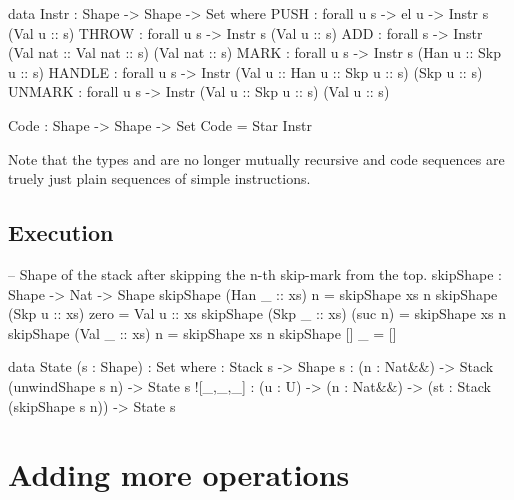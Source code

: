 \begin{code}
  data Instr : Shape -> Shape -> Set where
    PUSH : forall {u s} -> el u -> Instr s (Val u :: s)
    THROW : forall {u s} -> Instr s (Val u :: s)
    ADD : forall {s} -> Instr (Val nat :: Val nat :: s) (Val nat :: s)
    MARK : forall {u s} -> Instr s (Han u :: Skp u :: s)
    HANDLE : forall {u s} -> Instr (Val u :: Han u :: Skp u :: s) (Skp u :: s)
    UNMARK : forall {u s} -> Instr (Val u :: Skp u :: s) (Val u :: s)
\end{code}
\begin{code}
  Code : Shape -> Shape -> Set
  Code = Star Instr
\end{code}
\noindent Note that the types  and  are no longer mutually recursive
and code sequences are truely just plain sequences of simple instructions.

\subsection{Execution}

\begin{code}
  -- Shape of the stack after skipping the n-th skip-mark from the top.
  skipShape : Shape -> Nat -> Shape
  skipShape (Han _ :: xs)  n      = skipShape xs n
  skipShape (Skp u :: xs)  zero   = Val u :: xs
  skipShape (Skp _ :: xs) (suc n) = skipShape xs n
  skipShape (Val _ :: xs)  n      = skipShape xs n
  skipShape []            _      = []
\end{code}


\begin{code}
  data State (s : Shape) : Set where
    \tick[_] : Stack s -> Shape s
    \x[_,_] : (n : Nat&\!&) -> Stack (unwindShape s n) -> State s
    ![_,_,_] : (u : U) -> (n : Nat&\!&) -> (st : Stack (skipShape s n)) -> State s
\end{code}

\section{Adding more operations}






























































